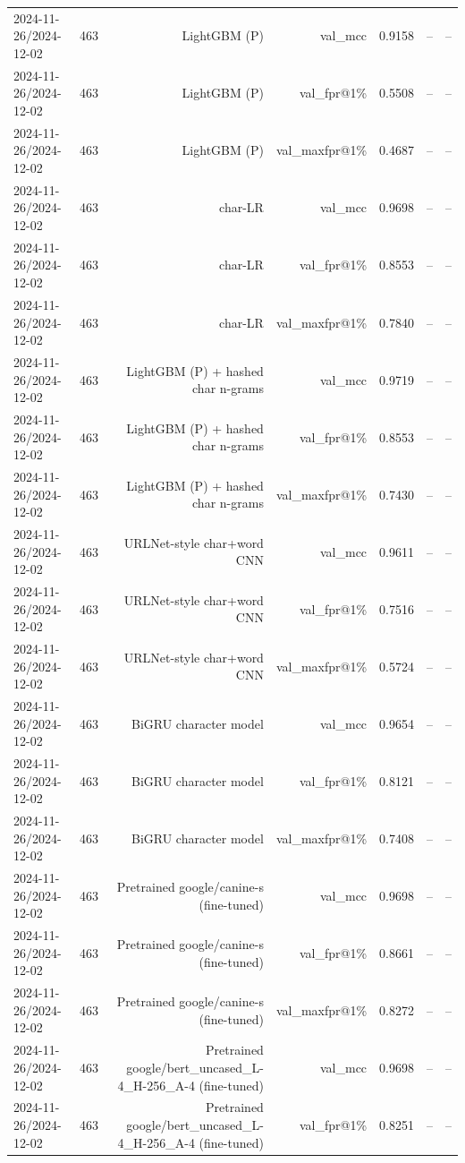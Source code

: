 \begin{table}[t]
\begin{tabular}{llrrrrr}
2024-11-26/2024-12-02 & 463 & LightGBM (P) & val\_mcc & 0.9158 & -- & -- \\
2024-11-26/2024-12-02 & 463 & LightGBM (P) & val\_fpr@1\% & 0.5508 & -- & -- \\
2024-11-26/2024-12-02 & 463 & LightGBM (P) & val\_maxfpr@1\% & 0.4687 & -- & -- \\
2024-11-26/2024-12-02 & 463 & char-LR & val\_mcc & 0.9698 & -- & -- \\
2024-11-26/2024-12-02 & 463 & char-LR & val\_fpr@1\% & 0.8553 & -- & -- \\
2024-11-26/2024-12-02 & 463 & char-LR & val\_maxfpr@1\% & 0.7840 & -- & -- \\
2024-11-26/2024-12-02 & 463 & LightGBM (P) + hashed char n-grams & val\_mcc & 0.9719 & -- & -- \\
2024-11-26/2024-12-02 & 463 & LightGBM (P) + hashed char n-grams & val\_fpr@1\% & 0.8553 & -- & -- \\
2024-11-26/2024-12-02 & 463 & LightGBM (P) + hashed char n-grams & val\_maxfpr@1\% & 0.7430 & -- & -- \\
2024-11-26/2024-12-02 & 463 & URLNet-style char+word CNN & val\_mcc & 0.9611 & -- & -- \\
2024-11-26/2024-12-02 & 463 & URLNet-style char+word CNN & val\_fpr@1\% & 0.7516 & -- & -- \\
2024-11-26/2024-12-02 & 463 & URLNet-style char+word CNN & val\_maxfpr@1\% & 0.5724 & -- & -- \\
2024-11-26/2024-12-02 & 463 & BiGRU character model & val\_mcc & 0.9654 & -- & -- \\
2024-11-26/2024-12-02 & 463 & BiGRU character model & val\_fpr@1\% & 0.8121 & -- & -- \\
2024-11-26/2024-12-02 & 463 & BiGRU character model & val\_maxfpr@1\% & 0.7408 & -- & -- \\
2024-11-26/2024-12-02 & 463 & Pretrained google/canine-s (fine-tuned) & val\_mcc & 0.9698 & -- & -- \\
2024-11-26/2024-12-02 & 463 & Pretrained google/canine-s (fine-tuned) & val\_fpr@1\% & 0.8661 & -- & -- \\
2024-11-26/2024-12-02 & 463 & Pretrained google/canine-s (fine-tuned) & val\_maxfpr@1\% & 0.8272 & -- & -- \\
2024-11-26/2024-12-02 & 463 & Pretrained google/bert\_uncased\_L-4\_H-256\_A-4 (fine-tuned) & val\_mcc & 0.9698 & -- & -- \\
2024-11-26/2024-12-02 & 463 & Pretrained google/bert\_uncased\_L-4\_H-256\_A-4 (fine-tuned) & val\_fpr@1\% & 0.8251 & -- & -- \\

\end{tabular}
\end{table}
